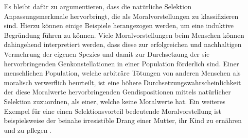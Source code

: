 \documentclass[a4paper,11pt]{article}
\numberwithin{equation}{section}
\begin{document}
Es bleibt dafür zu argumentieren, dass die natürliche Selektion Anpassungsmerkmale hervorbringt, die als Moralvorstellungen zu klassifizieren sind. Hierzu können einige Beispiele herangezogen werden, um eine induktive Begründung führen zu können. Viele Moralvorstellungen beim Menschen können dahingehend interpretiert werden, dass diese zur erfolgreichen und nachhaltigen Vermehrung der eigenen Spezies und damit zur Durchsetzung der sie hervorbringenden Genkonstellationen in einer Population förderlich sind. Einer menschlichen Population, welche arbiträre Tötungen von anderen Menschen als moralisch verwerflich beurteilt, ist eine höhere Durchsetzungswahrscheinlichkeit der diese Moralwerte hervorbringenden Gendispositionen mittels natürlicher Selektion zuzuordnen, als einer, welche keine Moralwerte hat. Ein weiteres Exempel für eine einen Selektionsvorteil bedeutende Moralvorstellung ist beispielsweise der beinahe irresistible Drang einer Mutter, ihr Kind zu ernähren und zu pflegen \cite[S. 401]{Linville2009-LINTMA-2}. 
\end{document}
